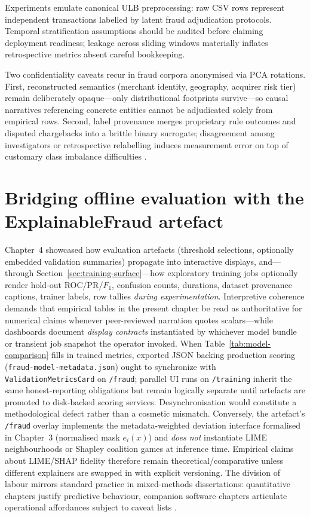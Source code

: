 Experiments emulate canonical ULB preprocessing: raw CSV rows represent independent transactions labelled by latent fraud adjudication protocols. Temporal stratification assumptions should be audited before claiming deployment readiness; leakage across sliding windows materially inflates retrospective metrics absent careful bookkeeping.

Two confidentiality caveats recur in fraud corpora anonymised via PCA rotations. First, reconstructed semantics (merchant identity, geography, acquirer risk tier) remain deliberately opaque—only distributional footprints survive—so causal narratives referencing concrete entities cannot be adjudicated solely from empirical rows. Second, label provenance merges proprietary rule outcomes and disputed chargebacks into a brittle binary surrogate; disagreement among investigators or retrospective relabelling induces measurement error on top of customary class imbalance difficulties \cite{fraud_handbook,lucas_jurgovsky_ccfraud_survey2020}.

\section{Bridging offline evaluation with the ExplainableFraud artefact}
Chapter~4 showcased how evaluation artefacts (threshold selections, optionally embedded validation summaries) propagate into interactive displays, and---through Section~\ref{sec:training-surface}---how exploratory training jobs optionally render hold-out ROC/PR/$F_{1}$, confusion counts, durations, dataset provenance captions, trainer labels, row tallies \emph{during experimentation}. Interpretive coherence demands that empirical tables in the present chapter be read as authoritative for numerical claims whenever peer-reviewed narration quotes scalars---while dashboards document \emph{display contracts} instantiated by whichever model bundle or transient job snapshot the operator invoked. When Table~\ref{tab:model-comparison} fills in trained metrics, exported JSON backing production scoring (\texttt{fraud-model-metadata.json}) ought to synchronize with \texttt{Validation\-Metrics\-Card} on \texttt{/fraud}; parallel UI runs on \texttt{/training} inherit the same honest-reporting obligations but remain logically separate until artefacts are promoted to disk-backed scoring services. Desynchronisation would constitute a methodological defect rather than a cosmetic mismatch. Conversely, the artefact's \texttt{/fraud} overlay implements the metadata-weighted deviation interface formalised in Chapter~3 (normalised mask $e_i(x)$) and \emph{does not} instantiate LIME neighbourhoods or Shapley coalition games at inference time. Empirical claims about LIME/SHAP fidelity therefore remain theoretical/comparative unless different explainers are swapped in with explicit versioning. The division of labour mirrors standard practice in mixed-methods dissertations: quantitative chapters justify predictive behaviour, companion software chapters articulate operational affordances subject to caveat lists \cite{slack2020_fooling_lime_shap,doshi_velez_kim_interpretability_2017}.

